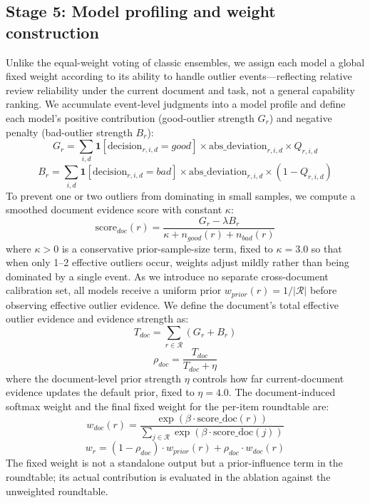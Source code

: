\documentclass[sn-mathphys-num]{sn-jnl}
\begin{document}
\subsection{Stage 5: Model profiling and weight construction}
Unlike the equal-weight voting of classic ensembles, we assign each model a global fixed weight according to its ability to handle outlier events---reflecting relative review reliability under the current document and task, not a general capability ranking. We accumulate event-level judgments into a model profile and define each model's positive contribution (good-outlier strength $G_r$) and negative penalty (bad-outlier strength $B_r$):
\begin{equation}
G_r = \sum_{i,d} \mathbf{1}\!\left[\mathrm{decision}_{r,i,d} = \mathit{good}\right]
\times \mathrm{abs\_deviation}_{r,i,d} \times Q_{r,i,d}
\label{eq:Gr}
\end{equation}
\begin{equation}
B_r = \sum_{i,d} \mathbf{1}\!\left[\mathrm{decision}_{r,i,d} = \mathit{bad}\right]
\times \mathrm{abs\_deviation}_{r,i,d} \times \left(1 - Q_{r,i,d}\right)
\label{eq:Br}
\end{equation}
To prevent one or two outliers from dominating in small samples, we compute a smoothed document evidence score with constant $\kappa$:
\begin{equation}
\mathrm{score}_{doc}(r) = \frac{G_r - \lambda B_r}{\kappa + n_{good}(r) + n_{bad}(r)}
\label{eq:scoredoc}
\end{equation}
where $\kappa>0$ is a conservative prior-sample-size term, fixed to $\kappa=3.0$ so that when only 1--2 effective outliers occur, weights adjust mildly rather than being dominated by a single event. As we introduce no separate cross-document calibration set, all models receive a uniform prior $w_{prior}(r)=1/|\mathcal{R}|$ before observing effective outlier evidence. We define the document's total effective outlier evidence and evidence strength as:
\begin{equation}
T_{doc} = \sum_{r \in \mathcal{R}} \left(G_r + B_r\right)
\label{eq:Tdoc}
\end{equation}
\begin{equation}
\rho_{doc} = \frac{T_{doc}}{T_{doc} + \eta}
\label{eq:rhodoc}
\end{equation}
where the document-level prior strength $\eta$ controls how far current-document evidence updates the default prior, fixed to $\eta=4.0$. The document-induced softmax weight and the final fixed weight for the per-item roundtable are:
\begin{equation}
w_{doc}(r) = \frac{\exp\!\left(\beta \cdot \mathrm{score\_doc}(r)\right)}
{\sum_{j \in \mathcal{R}} \exp\!\left(\beta \cdot \mathrm{score\_doc}(j)\right)}
\label{eq:wdoc}
\end{equation}
\begin{equation}
w_r = (1 - \rho_{doc}) \cdot w_{prior}(r) + \rho_{doc} \cdot w_{doc}(r)
\label{eq:wr}
\end{equation}
The fixed weight is not a standalone output but a prior-influence term in the roundtable; its actual contribution is evaluated in the ablation against the unweighted roundtable.
\end{document}
